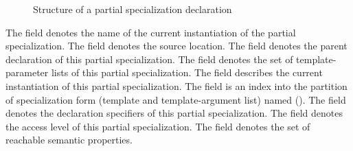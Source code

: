 %
\begin{figure}[H]
	\centering
	\caption{Structure of a partial specialization declaration}
	\label{fig:ifc-partial-specialization-decl-structure}
\end{figure}

The  field denotes the name of the current instantiation of the partial specialization.
The  field denotes the source location.
The  field denotes the parent declaration of this partial specialization.
The  field denotes the set of template-parameter lists of this partial specialization.
The  field describes the current instantiation of this partial specialization.
The  field is an index into the partition of specialization form (template and template-argument list) named  ().
The  field denotes the declaration specifiers of this partial specialization.
The  field denotes the access level of this partial specialization.
The  field denotes the set of reachable semantic properties.




\subsection{} 
\label{sec:ifc:DeclSort:Specialization}


